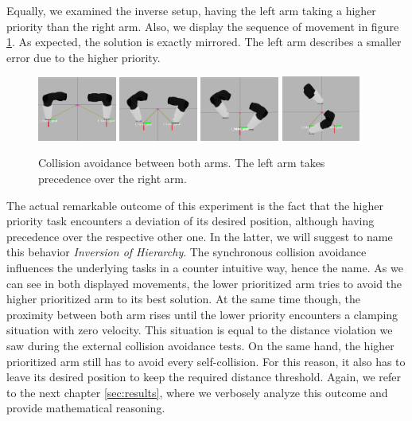 Equally, we examined the inverse setup, having the left arm taking a higher priority than the right arm. Also, we display the sequence of movement in figure \ref{fig:armleftoverright}. As expected, the solution is exactly mirrored. The left arm describes a smaller error due to the higher priority.
\begin{figure}[h!]
  \centering
    \includegraphics[width=0.23\textwidth]{../figures/left_over_right/1.png}
    \includegraphics[width=0.23\textwidth]{../figures/left_over_right/2.png}
    \includegraphics[width=0.23\textwidth]{../figures/left_over_right/3.png}
    \includegraphics[width=0.23\textwidth]{../figures/left_over_right/4.png}
    \caption{Collision avoidance between both arms. The left arm takes precedence over the right arm.}
    \label{fig:armleftoverright}
\end{figure}

The actual remarkable outcome of this experiment is the fact that the higher priority task encounters a deviation of its desired position, although having precedence over the respective other one. In the latter, we will suggest to name this behavior \textit{Inversion of Hierarchy}. The synchronous collision avoidance influences the underlying tasks in a counter intuitive way, hence the name. As we can see in both displayed movements, the lower prioritized arm tries to avoid the higher prioritized arm to its best solution. At the same time though, the proximity between both arm rises until the lower priority encounters a clamping situation with zero velocity. This situation is equal to the distance violation we saw during the external collision avoidance tests. On the same hand, the higher prioritized arm still has to avoid every self-collision. For this reason, it also has to leave its desired position to keep the required distance threshold. Again, we refer to the next chapter \ref{sec:results}, where we verbosely analyze this outcome and provide mathematical reasoning.

